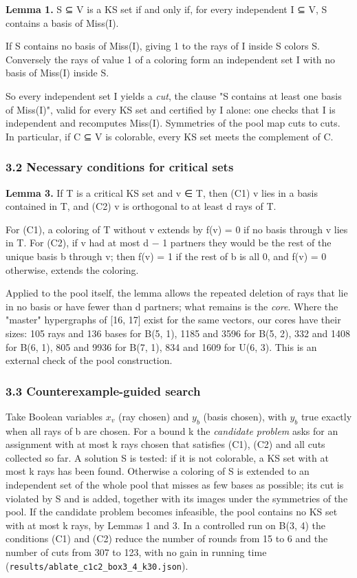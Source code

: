 \documentclass[11pt,a4paper]{article}
\begin{document}
\textbf{Lemma 1.} S ⊆ V is a KS set if and only if, for every independent I ⊆ V, S contains a basis of
Miss(I).

If S contains no basis of Miss(I), giving 1 to the rays of I inside S colors S. Conversely the rays of
value 1 of a coloring form an independent set I with no basis of Miss(I) inside S.

So every independent set I yields a \emph{cut}, the clause "S contains at least one basis of Miss(I)", valid
for every KS set and certified by I alone: one checks that I is independent and recomputes Miss(I).
Symmetries of the pool map cuts to cuts. In particular, if C ⊆ V is colorable, every KS set meets the
complement of C.

\subsubsection{3.2 Necessary conditions for critical sets}\label{32-necessary-conditions-for-critical-sets}

\textbf{Lemma 3.} If T is a critical KS set and v ∈ T, then (C1) v lies in a basis contained in T, and (C2)
v is orthogonal to at least d rays of T.

For (C1), a coloring of T without v extends by f(v) = 0 if no basis through v lies in T. For (C2), if v
had at most d − 1 partners they would be the rest of the unique basis b through v; then f(v) = 1 if the
rest of b is all 0, and f(v) = 0 otherwise, extends the coloring.

Applied to the pool itself, the lemma allows the repeated deletion of rays that lie in no basis or have
fewer than d partners; what remains is the \emph{core}. Where the "master" hypergraphs of {[}16, 17{]} exist for
the same vectors, our cores have their sizes: 105 rays and 136 bases for B(5, 1), 1185 and 3596 for
B(5, 2), 332 and 1408 for B(6, 1), 805 and 9936 for B(7, 1), 834 and 1609 for U(6, 3). This is an
external check of the pool construction.

\subsubsection{3.3 Counterexample-guided search}\label{33-counterexample-guided-search}

Take Boolean variables \(x_v\) (ray chosen) and \(y_b\) (basis chosen), with \(y_b\) true exactly when all rays of b
are chosen. For a bound k the \emph{candidate problem} asks for an assignment with at most k rays chosen
that satisfies (C1), (C2) and all cuts collected so far. A solution S is tested: if it is not colorable,
a KS set with at most k rays has been found. Otherwise a coloring of S is extended to an independent
set of the whole pool that misses as few bases as possible; its cut is violated by S and is added,
together with its images under the symmetries of the pool. If the candidate problem becomes infeasible,
the pool contains no KS set with at most k rays, by Lemmas 1 and 3. In a controlled run on B(3, 4) the
conditions (C1) and (C2) reduce the number of rounds from 15 to 6 and the number of cuts from 307 to
123, with no gain in running time (\texttt{results/ablate\_c1c2\_box3\_4\_k30.json}).
\end{document}
